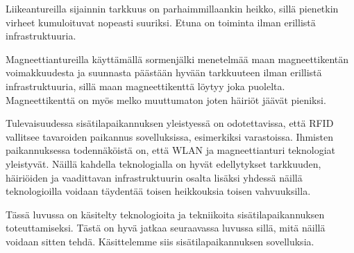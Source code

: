 Liikeantureilla sijainnin tarkkuus on parhaimmillaankin heikko, sillä pienetkin virheet kumuloituvat nopeasti suuriksi. Etuna on toiminta ilman erillistä infrastruktuuria.

Magneettiantureilla käyttämällä sormenjälki menetelmää maan magneettikentän voimakkuudesta ja suunnasta päästään hyvään tarkkuuteen ilman erillistä infrastruktuuria, sillä maan magneettikenttä löytyy joka puolelta. Magneettikenttä on myös melko muuttumaton joten häiriöt jäävät pieniksi. 

Tulevaisuudessa sisätilapaikannuksen yleistyessä on odotettavissa, että RFID vallitsee tavaroiden paikannus sovelluksissa, esimerkiksi varastoissa. Ihmisten paikannuksessa todennäköistä on, että WLAN ja magneettianturi teknologiat yleistyvät. Näillä kahdella teknologialla on hyvät edellytykset tarkkuuden, häiriöiden ja vaadittavan infrastruktuurin osalta lisäksi yhdessä näillä teknologioilla voidaan täydentää toisen heikkouksia toisen vahvuuksilla.

Tässä luvussa on käsitelty teknologioita ja tekniikoita sisätilapaikannuksen toteuttamiseksi. Tästä on hyvä jatkaa seuraavassa luvussa sillä, mitä näillä voidaan sitten tehdä. Käsittelemme siis sisätilapaikannuksen sovelluksia.



